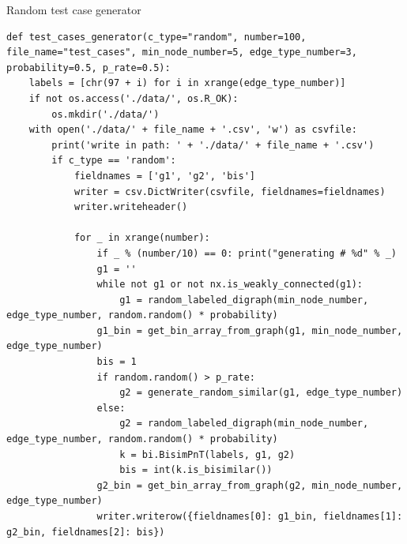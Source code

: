 \begin{code}
\caption{Random test case generator}
\label{lst:ramgene}
\begin{verbatim}
def test_cases_generator(c_type="random", number=100, file_name="test_cases", min_node_number=5, edge_type_number=3, probability=0.5, p_rate=0.5):
    labels = [chr(97 + i) for i in xrange(edge_type_number)]
    if not os.access('./data/', os.R_OK):
        os.mkdir('./data/')
    with open('./data/' + file_name + '.csv', 'w') as csvfile:
        print('write in path: ' + './data/' + file_name + '.csv')
        if c_type == 'random':
            fieldnames = ['g1', 'g2', 'bis']
            writer = csv.DictWriter(csvfile, fieldnames=fieldnames)
            writer.writeheader()

            for _ in xrange(number):
                if _ % (number/10) == 0: print("generating # %d" % _)
                g1 = ''
                while not g1 or not nx.is_weakly_connected(g1):
                    g1 = random_labeled_digraph(min_node_number, edge_type_number, random.random() * probability)
                g1_bin = get_bin_array_from_graph(g1, min_node_number, edge_type_number)
                bis = 1
                if random.random() > p_rate:
                    g2 = generate_random_similar(g1, edge_type_number)
                else:
                    g2 = random_labeled_digraph(min_node_number, edge_type_number, random.random() * probability)
                    k = bi.BisimPnT(labels, g1, g2)
                    bis = int(k.is_bisimilar())
                g2_bin = get_bin_array_from_graph(g2, min_node_number, edge_type_number)
                writer.writerow({fieldnames[0]: g1_bin, fieldnames[1]: g2_bin, fieldnames[2]: bis})
\end{verbatim}
\end{code}


